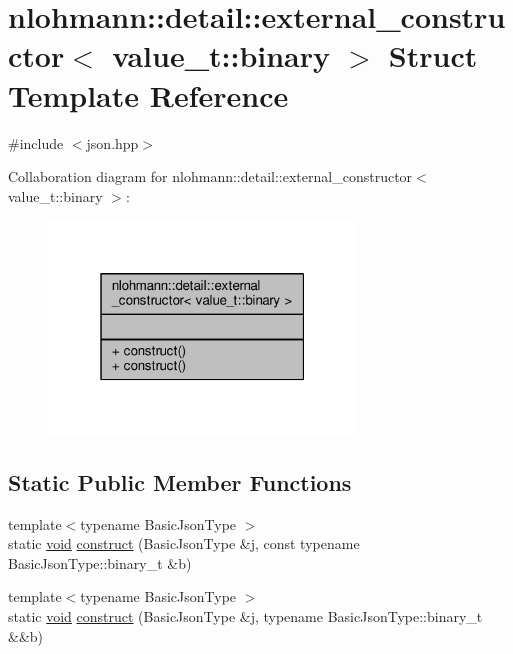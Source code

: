 \hypertarget{structnlohmann_1_1detail_1_1external__constructor_3_01value__t_1_1binary_01_4}{}\section{nlohmann\+:\+:detail\+:\+:external\+\_\+constructor$<$ value\+\_\+t\+:\+:binary $>$ Struct Template Reference}
\label{structnlohmann_1_1detail_1_1external__constructor_3_01value__t_1_1binary_01_4}


{\ttfamily \#include $<$json.\+hpp$>$}



Collaboration diagram for nlohmann\+:\+:detail\+:\+:external\+\_\+constructor$<$ value\+\_\+t\+:\+:binary $>$\+:
\nopagebreak
\begin{figure}[H]
\begin{center}
\leavevmode
\includegraphics[width=232pt]{structnlohmann_1_1detail_1_1external__constructor_3_01value__t_1_1binary_01_4__coll__graph}
\end{center}
\end{figure}
\subsection*{Static Public Member Functions}
\begin{DoxyCompactItemize}
\item 
{\footnotesize template$<$typename Basic\+Json\+Type $>$ }\\static \hyperlink{namespacenlohmann_1_1detail_a59fca69799f6b9e366710cb9043aa77d}{void} \hyperlink{structnlohmann_1_1detail_1_1external__constructor_3_01value__t_1_1binary_01_4_a0ff0da4f9a4d27955961477102c50a27}{construct} (Basic\+Json\+Type \&j, const typename Basic\+Json\+Type\+::binary\+\_\+t \&b)
\item 
{\footnotesize template$<$typename Basic\+Json\+Type $>$ }\\static \hyperlink{namespacenlohmann_1_1detail_a59fca69799f6b9e366710cb9043aa77d}{void} \hyperlink{structnlohmann_1_1detail_1_1external__constructor_3_01value__t_1_1binary_01_4_a1c478157dc8bad20f09572c5b2406150}{construct} (Basic\+Json\+Type \&j, typename Basic\+Json\+Type\+::binary\+\_\+t \&\&b)
\end{DoxyCompactItemize}


